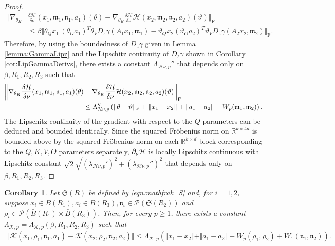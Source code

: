 \documentclass{article}
\newtheorem{corollary}[theorem]{Corollary}
\newcommand{\R}{\mathbb{R}}
\begin{document}
\begin{appendices}
\begin{proof}
    \begin{align*}
        \bigg\Vert \nabla_{\theta_K}&\frac{\delta\mathcal H}{\delta \nu}(x_1,\mathfrak{m}_1,\mathfrak{n}_1,a_1)(\theta)- \nabla_{\theta_K}\frac{\delta\mathcal H}{\delta \nu}\mathcal H(x_2,\mathfrak{m}_2,\mathfrak{n}_2,a_2)(\vartheta)\bigg\Vert_\mathrm{F}\\& \le \beta\Vert\theta_{Q}x_1\, (\theta_{O}a_1)^T \theta_{V}D_z\gamma(A_1x_1,\mathfrak{m}_1)- \vartheta_{Q}x_2(\vartheta_{O}a_2)^T\vartheta_{V}D_z\gamma(A_2x_2,\mathfrak{m}_2)\Vert_\mathrm{F}.    
    \end{align*}
    Therefore, by using the boundedness of $D_z\gamma$ given in Lemma \ref{lemma:GammaLipz} and the Lipschitz continuity of $D_z\gamma$ shown in Corollary \ref{cor:LipGammaDerivs}, there exists a constant $\Lambda_{\mathcal H\nu,p}''$ that depends only on $\beta,R_1,R_2,R_3$ such that
    \begin{align*}
        \bigg\Vert \nabla_{\theta_K}\frac{\delta\mathcal H}{\delta \nu}(x_1,\mathfrak{m}_1,\mathfrak{n}_1,a_1)(\theta)&- \nabla_{\theta_K}\frac{\delta\mathcal H}{\delta \nu}\mathcal H(x_2,\mathfrak{m}_2,\mathfrak{n}_2,a_2)(\vartheta)\bigg\Vert_\mathrm{F}\\& \le \Lambda_{\mathcal H\nu,p}''\left(\Vert \theta-\vartheta\Vert_\mathrm{F}+\Vert x_1-x_2\Vert +\Vert a_1-a_2\Vert+W_p(\mathfrak{m}_1,\mathfrak{m}_2)\right).\notag
    \end{align*}
    The Lipschitz continuity of the gradient with respect to the $Q$ parameters can be deduced and bounded identically. Since the squared Fr\"obenius norm on $\R^{k\times 4d}$ is bounded above by the squared Fr\"obenius norm on each $\R^{k\times d}$ block corresponding to the $Q,K,V,O$ parameters separately, $\partial_\nu\mathcal H$ is locally Lipschitz continuous with Lipschitz constant $\sqrt{2}\sqrt{(\lambda_{\mathcal H\nu,p}')^2+(\lambda_{\mathcal H\nu,p}'')^2}
    $ that depends only on $\beta,R_1,R_2,R_3$.
\end{proof}
\begin{corollary}\label{cor:LipmathcalK}
Let $\mathfrak{S}(R)$ be defined by \ref{eqn:mathfrak_S} and, for $i=1,2$, suppose $x_i\in \bar B(R_1), a_i \in \bar B(R_3), \mathfrak{n}_i\in \mathcal P(\mathfrak{S}(R_2))$ and $\rho_i\in \mathcal P(\bar B(R_1)\times \bar B(R_3))$. Then, for every $p\ge 1$, there exists a constant \\$\Lambda_{\mathcal K,p}=\Lambda_{\mathcal K,p}(\beta,R_1,R_2,R_3)$ such that 
    \begin{align*}
        \Vert \mathcal K(x_1,\rho_1,\mathfrak{n}_1,a_1)-\mathcal K(x_2,\rho_2,\mathfrak{n}_2,a_2)\Vert \le \Lambda_{\mathcal{K},p}\left(\Vert x_1-x_2\Vert+\Vert a_1-a_2\Vert +W_p(\rho_1,\rho_2)+W_1(\mathfrak{n}_1,\mathfrak{n}_2)\right).

\end{align*}
\end{corollary}
\end{appendices}
\end{document}
